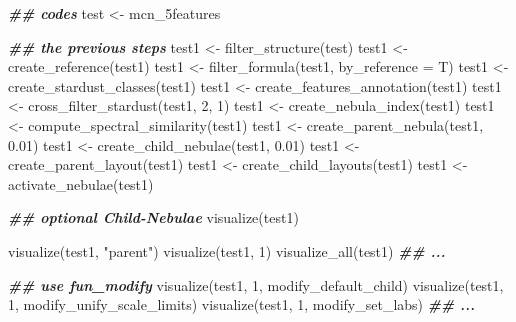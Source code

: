 \documentclass[
]{article}
\newenvironment{Shaded}{\begin{snugshade}}{\end{snugshade}}
\newcommand{\AttributeTok}[1]{\textcolor[rgb]{0.77,0.63,0.00}{#1}}
\newcommand{\DecValTok}[1]{\textcolor[rgb]{0.00,0.00,0.81}{#1}}
\newcommand{\DocumentationTok}[1]{\textcolor[rgb]{0.56,0.35,0.01}{\textbf{\textit{#1}}}}
\newcommand{\FloatTok}[1]{\textcolor[rgb]{0.00,0.00,0.81}{#1}}
\newcommand{\FunctionTok}[1]{\textcolor[rgb]{0.00,0.00,0.00}{#1}}
\newcommand{\NormalTok}[1]{#1}
\newcommand{\OtherTok}[1]{\textcolor[rgb]{0.56,0.35,0.01}{#1}}
\newcommand{\StringTok}[1]{\textcolor[rgb]{0.31,0.60,0.02}{#1}}
\begin{document}
\begin{Shaded}
\begin{Highlighting}[]
\DocumentationTok{\#\# codes}
\NormalTok{test }\OtherTok{\textless{}{-}}\NormalTok{ mcn\_5features}

\DocumentationTok{\#\# the previous steps}
\NormalTok{test1 }\OtherTok{\textless{}{-}} \FunctionTok{filter\_structure}\NormalTok{(test)}
\NormalTok{test1 }\OtherTok{\textless{}{-}} \FunctionTok{create\_reference}\NormalTok{(test1)}
\NormalTok{test1 }\OtherTok{\textless{}{-}} \FunctionTok{filter\_formula}\NormalTok{(test1, }\AttributeTok{by\_reference =}\NormalTok{ T)}
\NormalTok{test1 }\OtherTok{\textless{}{-}} \FunctionTok{create\_stardust\_classes}\NormalTok{(test1)}
\NormalTok{test1 }\OtherTok{\textless{}{-}} \FunctionTok{create\_features\_annotation}\NormalTok{(test1)}
\NormalTok{test1 }\OtherTok{\textless{}{-}} \FunctionTok{cross\_filter\_stardust}\NormalTok{(test1, }\DecValTok{2}\NormalTok{, }\DecValTok{1}\NormalTok{)}
\NormalTok{test1 }\OtherTok{\textless{}{-}} \FunctionTok{create\_nebula\_index}\NormalTok{(test1)}
\NormalTok{test1 }\OtherTok{\textless{}{-}} \FunctionTok{compute\_spectral\_similarity}\NormalTok{(test1)}
\NormalTok{test1 }\OtherTok{\textless{}{-}} \FunctionTok{create\_parent\_nebula}\NormalTok{(test1, }\FloatTok{0.01}\NormalTok{)}
\NormalTok{test1 }\OtherTok{\textless{}{-}} \FunctionTok{create\_child\_nebulae}\NormalTok{(test1, }\FloatTok{0.01}\NormalTok{)}
\NormalTok{test1 }\OtherTok{\textless{}{-}} \FunctionTok{create\_parent\_layout}\NormalTok{(test1)}
\NormalTok{test1 }\OtherTok{\textless{}{-}} \FunctionTok{create\_child\_layouts}\NormalTok{(test1)}
\NormalTok{test1 }\OtherTok{\textless{}{-}} \FunctionTok{activate\_nebulae}\NormalTok{(test1)}

\DocumentationTok{\#\# optional Child{-}Nebulae}
\FunctionTok{visualize}\NormalTok{(test1)}

\FunctionTok{visualize}\NormalTok{(test1, }\StringTok{"parent"}\NormalTok{)}
\FunctionTok{visualize}\NormalTok{(test1, }\DecValTok{1}\NormalTok{)}
\FunctionTok{visualize\_all}\NormalTok{(test1)}
\DocumentationTok{\#\# ...}

\DocumentationTok{\#\# use \textquotesingle{}fun\_modify\textquotesingle{}}
\FunctionTok{visualize}\NormalTok{(test1, }\DecValTok{1}\NormalTok{, modify\_default\_child)}
\FunctionTok{visualize}\NormalTok{(test1, }\DecValTok{1}\NormalTok{, modify\_unify\_scale\_limits)}
\FunctionTok{visualize}\NormalTok{(test1, }\DecValTok{1}\NormalTok{, modify\_set\_labs)}
\DocumentationTok{\#\# ...}
\end{Highlighting}
\end{Shaded}
\end{document}
